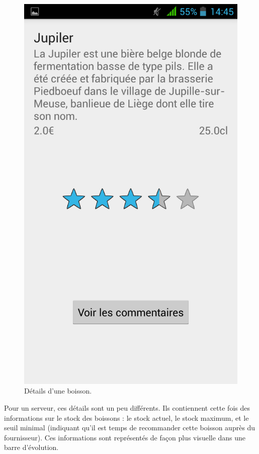 \begin{figure}[H]
	\centering
	\includegraphics[scale=0.15]{img/drink-details.png}
	\caption{Détails d'une boisson.}
	\label{fig:drink-details}
\end{figure}

Pour un serveur, ces détails sont un peu différents. Ils contiennent
cette fois des informations sur le stock des boissons : le stock
actuel, le stock maximum, et le seuil minimal (indiquant qu'il est temps
de recommander cette boisson auprès du fournisseur). Ces informations
sont représentés de façon plus visuelle dans une barre d'évolution.

